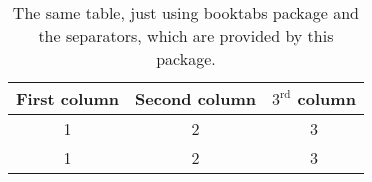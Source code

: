 \begin{table}[h]
    \centering
    \caption{The same table, just using booktabs package and the
        separators, which are provided by this package.}
    \begin{tabular}{ccc}
        \toprule
        First column & Second column & $\mathrm{3^{rd}}$ column
        \tabularnewline\midrule
        1 & 2 & 3
        \tabularnewline
        1 & 2 & 3
        \tabularnewline\bottomrule
    \end{tabular}
    \label{tab:table2}
\end{table}
